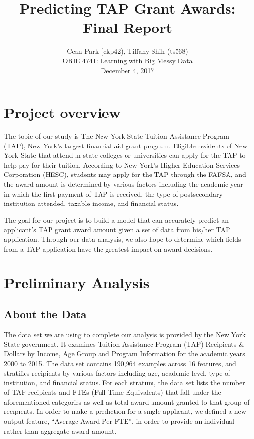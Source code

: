 \documentclass[12pt, fleqn]{article}
\begin{document}
\title{\vspace{-2cm} Predicting TAP Grant Awards: Final Report}
\author{Cean Park (ckp42), Tiffany Shih (ts568)\\
ORIE 4741: Learning with Big Messy Data \\ December 4, 2017}
\date{}

\maketitle

\vspace{-1cm}
\section{Project overview} 
The topic of our study is The New York State Tuition Assistance Program (TAP), New York's largest financial aid grant program. Eligible residents of New York State that attend in-state colleges or universities can apply for the TAP to help pay for their tuition. According to New York's Higher Education Services Corporation (HESC), students may apply for the TAP through the FAFSA, and the award amount is determined by various factors including the academic year in which the first payment of TAP is received, the type of postsecondary institution attended, taxable income, and financial status. 

The goal for our project is to build a model that can accurately predict an applicant's TAP grant award amount given a set of data from his/her TAP application. Through our data analysis, we also hope to determine which fields from a TAP application have the greatest impact on award decisions.

\section{Preliminary Analysis}

\subsection{About the Data}
The data set we are using to complete our analysis is provided by the New York State government. It examines Tuition Assistance Program (TAP) Recipients \& Dollars by Income, Age Group and Program Information for the academic years 2000 to 2015. The data set contains 190,964 examples across 16 features, and stratifies recipients by various factors including age, academic level, type of institution, and financial status. For each stratum, the data set lists the number of TAP recipients and FTEs (Full Time Equivalents) that fall under the aforementioned categories as well as total award amount granted to that group of recipients. In order to make a prediction for a single applicant, we defined a new output feature, ``Average Award Per FTE'', in order to provide an individual rather than aggregate award amount.
\end{document}
